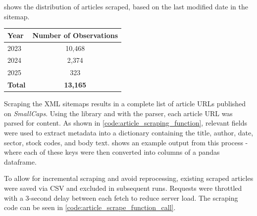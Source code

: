  shows the distribution of articles scraped, based on the last modified date in the sitemap.

\begin{minipage}{0.48\textwidth}
    
\end{minipage}
\hfill
\begin{minipage}{0.48\textwidth}
    
    \vspace{2cm}
    \begin{tabular}{lc}
        \toprule
        \textbf{Year} & \textbf{Number of Observations} \\
        \midrule
        2023 & 10,468 \\
        2024 & 2,374 \\
        2025 & 323 \\
        \midrule
        \textbf{Total} & \textbf{13,165} \\
        \bottomrule
    \end{tabular}
    \label{tab:xml_article_counts}
\end{minipage}

Scraping the XML sitemaps results in a complete list of article URLs published on \textit{SmallCaps}. Using the  library and  with the  parser, each article URL was parsed for content. As shown in \cref{code:article_scraping_function}, relevant fields were used to extract metadata into a dictionary containing the title, author, date, sector, stock codes, and body text.  shows an example output from this process - where each of these keys were then converted into columns of a pandas dataframe.

To allow for incremental scraping and avoid reprocessing, existing scraped articles were saved via CSV and excluded in subsequent runs. Requests were throttled with a 3-second delay between each fetch to reduce server load. The scraping code can be seen in \cref{code:article_scrape_function_call}. 

